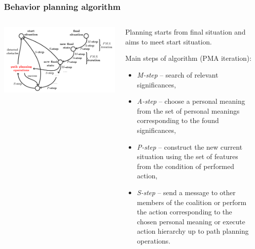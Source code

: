 \documentclass[default]{beamer}
\begin{document}
	\begin{frame}
		\frametitle{Behavior planning algorithm}
		
		\begin{columns}
			\begin{column}{0.7\textwidth}
				\includegraphics[width=\textwidth]{strl/beh_plan-0.png}
			\end{column}
			\begin{column}{0.3\textwidth}
				\tiny
				Planning starts from final situation and aims to meet start situation.
				\par\bigskip
				Main steps of algorithm (PMA iteration):
				\begin{itemize}
					\item \textit{M-step} -- search of relevant significances,
					\item \textit{A-step} -- choose a personal meaning from the set of personal meanings corresponding to the found significances,
					\item \textit{P-step} -- construct the new current situation using the set of features from the condition of performed action,
					\item \textit{S-step} -- send a message to other members of the coalition  or perform the action corresponding to the chosen personal meaning or execute action hierarchy up to \color{red} path planning operations.
				\end{itemize}
			\end{column}
		\end{columns}
	\end{frame}	
\end{document}
